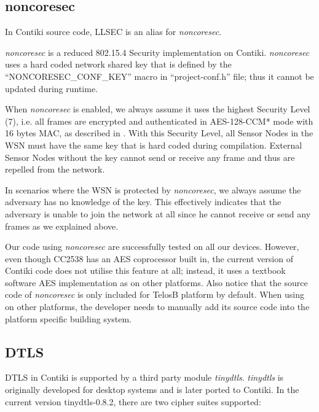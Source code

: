 \subsection{noncoresec} \label{Subsec: noncoresec in experiment}

In Contiki source code, LLSEC is an alias for \textit{noncoresec}.

\textit{noncoresec}\cite{noncoresec}\cite{LLSEC} is a reduced 802.15.4 Security implementation on Contiki. \textit{noncoresec} uses a hard coded network shared key that is defined by the ``NONCORESEC\_CONF\_KEY'' macro in ``project-conf.h'' file; thus it cannot be updated during runtime. 

When \textit{noncoresec} is enabled, we always assume it uses the highest Security Level (7), i.e. all frames are encrypted and authenticated in AES-128-CCM* mode with 16 bytes MAC, as described in . With this Security Level, all Sensor Nodes in the WSN must have the same key that is hard coded during compilation. External Sensor Nodes without the key cannot send or receive any frame and thus are repelled from the network.

In scenarios where the WSN is protected by \textit{noncoresec}, we always assume the adversary has no knowledge of the key. This effectively indicates that the adversary is unable to join the network at all since he cannot receive or send any frames as we explained above.

Our code using \textit{noncoresec} are successfully tested on all our devices. However, even though CC2538 has an AES coprocessor built in, the current version of Contiki code does not utilise this feature at all; instead, it uses a textbook software AES implementation as on other platforms. Also notice that the source code of \textit{noncoresec} is only included for TelosB platform by default. When using on other platforms, the developer needs to manually add its source code into the platform specific building system.

\subsection{DTLS} \label{Subsec: Experiment DTLS}

DTLS in Contiki is supported by a third party module \textit{tinydtls}\cite{tinydtls}. \textit{tinydtls} is originally developed for desktop systems and is later ported to Contiki. In the current version tinydtls-0.8.2, there are two cipher suites supported:

